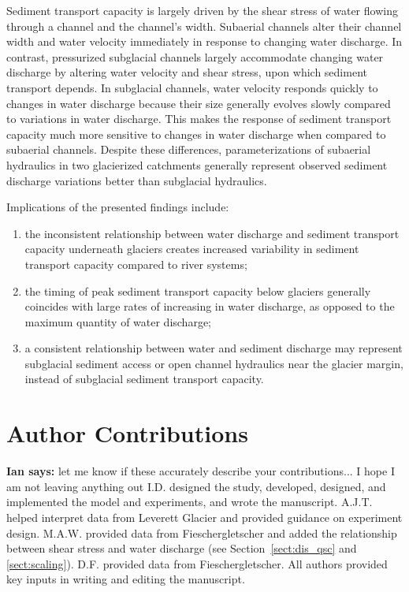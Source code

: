 \documentclass[draft]{agujournal2019}
\newcommand{\ian}[1]{{\textbf{\color{blue}Ian says:} \color{blue} #1} }
\begin{document}
Sediment transport capacity is largely driven by the shear stress of water flowing through a channel and the channel's width.
Subaerial channels  alter their channel width and water velocity immediately in response to changing water discharge.
In contrast, pressurized subglacial channels largely accommodate changing water discharge by altering water velocity and shear stress, upon which sediment transport depends.
In subglacial channels, water velocity responds quickly to changes in water discharge because their size generally evolves slowly compared to variations in water discharge.
This makes the response of sediment transport capacity much more sensitive to changes in water discharge when compared to subaerial channels. 
Despite these differences, parameterizations of subaerial hydraulics in two glacierized catchments generally represent observed sediment discharge variations better than subglacial hydraulics.


Implications of the presented findings include:
\begin{enumerate}
\item the inconsistent relationship between water discharge and sediment transport capacity underneath glaciers creates increased variability in sediment transport capacity compared to river systems;
\item the timing of peak sediment transport capacity below glaciers generally coincides with large rates of increasing in water discharge, as opposed to the maximum quantity of water discharge;
\item a consistent relationship between water and sediment discharge may represent subglacial sediment access or open channel hydraulics near the glacier margin, instead of subglacial sediment transport capacity.

\end{enumerate}

\section*{Author Contributions}
\ian{let me know if these accurately describe your contributions... I hope I am not leaving anything out}
I.D. designed the study, developed, designed, and implemented the model and experiments, and wrote the manuscript.
A.J.T. helped interpret data from Leverett Glacier and provided guidance on experiment design.
M.A.W. provided data from Fieschergletscher and added the relationship between shear stress and water discharge (see Section~\ref{sect:dis_qsc} and \ref{sect:scaling}).
D.F. provided data from Fieschergletscher.
All authors provided  key inputs in writing and editing the manuscript. 
\end{document}
